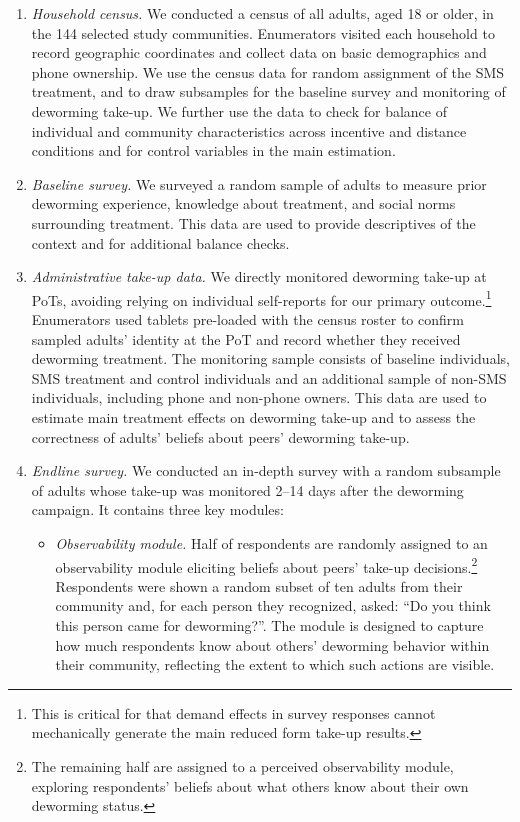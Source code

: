 \begin{enumerate} 
\item \emph{Household census.}
We conducted a census of all adults, aged 18 or older, in the 144 selected study communities. Enumerators visited each household to record geographic coordinates and collect data on basic demographics and phone ownership. We use the census data for random assignment of the SMS treatment, and to draw subsamples for the baseline survey and monitoring of deworming take-up. We further use the data to check for balance of individual and community characteristics across incentive and distance conditions and for control variables in the main estimation. 

\item \emph{Baseline survey.} We surveyed a random sample of adults to measure prior deworming experience, knowledge about treatment, and social norms surrounding treatment. This data are used to provide descriptives of the context and for additional balance checks. 

\item \emph{Administrative take-up data.} We directly monitored deworming take-up at PoTs, avoiding relying on individual self-reports for our primary outcome.\footnote{This is critical for that demand effects in survey responses cannot mechanically generate the main reduced form take-up results.} Enumerators used tablets pre-loaded with the census roster to confirm sampled adults' identity at the PoT and record whether they received deworming treatment. The monitoring sample consists of baseline individuals, SMS treatment and control individuals and an additional sample of non-SMS individuals, including phone and non-phone owners. This data are used to estimate main treatment effects on deworming take-up and to assess the correctness of adults' beliefs about peers' deworming take-up.


  \item \emph{Endline survey.} We conducted an in-depth survey with a random subsample of adults whose take-up was monitored 2–14 days after the deworming campaign. It contains three key modules:
  \begin{itemize} 
      \item \emph{Observability module.} Half of respondents are
  randomly assigned to an observability module eliciting beliefs
  about peers' take-up decisions.\footnote{The remaining half are assigned to a perceived observability module, exploring respondents' beliefs about what others know about their own deworming status.} Respondents were shown a random subset of ten adults from their community and, for each person they recognized, asked: ``Do you think this person came for deworming?''. The module is designed to capture how much respondents know about others’ deworming behavior within their community, reflecting the extent to which such actions are visible.
        

\end{itemize}
\end{enumerate}
